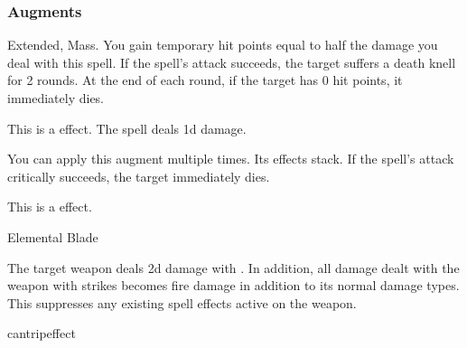 \subsubsection{Augments}
 Extended, Mass.
You gain temporary hit points equal to half the damage you deal with this spell.
If the spell's attack succeeds, the target suffers a death knell for 2 rounds.
At the end of each round, if the target has 0 hit points, it immediately dies.
\par
This is a  effect.
The spell deals \plus1d damage.
\par
You can apply this augment multiple times.
Its effects stack.
If the spell's attack critically succeeds, the target immediately dies.
\par
This is a  effect.
\begin{spellsection}{Elemental Blade}
\begin{spellheader}
\end{spellheader}
\begin{spellcontent}
\begin{spelltargetinginfo}
\end{spelltargetinginfo}
\begin{spelleffects}
\spelleffect
The target weapon deals \plus2d damage with .
In addition, all damage dealt with the weapon with strikes becomes fire damage in addition to its normal damage types.
This suppresses any existing spell effects active on the weapon.
\spelldur \durshort
\end{spelleffects}
\end{spellcontent}
\begin{spellfooter}
\miscastexplode
\end{spellfooter}
\begin{spellcantrip}
cantripeffect
\end{spellcantrip}
\end{spellsection}

